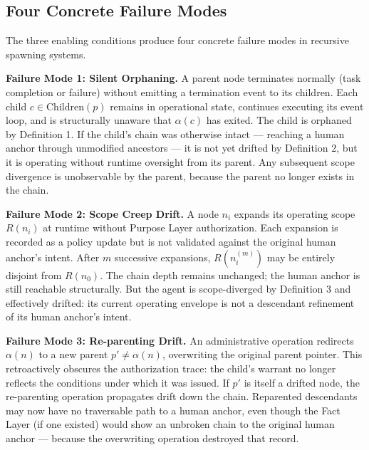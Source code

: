 \subsection{Four Concrete Failure Modes}

The three enabling conditions produce four concrete failure modes in recursive spawning systems.

\medskip
\noindent\textbf{Failure Mode 1: Silent Orphaning.}  A parent node terminates normally (task completion or failure) without emitting a termination event to its children.  Each child $c \in \text{Children}(p)$ remains in operational state, continues executing its event loop, and is structurally unaware that $\alpha(c)$ has exited.  The child is orphaned by Definition 1.  If the child's chain was otherwise intact — reaching a human anchor through unmodified ancestors — it is not yet drifted by Definition 2, but it is operating without runtime oversight from its parent.  Any subsequent scope divergence is unobservable by the parent, because the parent no longer exists in the chain.

\medskip
\noindent\textbf{Failure Mode 2: Scope Creep Drift.}  A node $n_i$ expands its operating scope $R(n_i)$ at runtime without Purpose Layer authorization.  Each expansion is recorded as a policy update but is not validated against the original human anchor's intent.  After $m$ successive expansions, $R(n_i^{(m)})$ may be entirely disjoint from $R(n_0)$.  The chain depth remains unchanged; the human anchor is still reachable structurally.  But the agent is scope-diverged by Definition 3 and effectively drifted: its current operating envelope is not a descendant refinement of its human anchor's intent.

\medskip
\noindent\textbf{Failure Mode 3: Re-parenting Drift.}  An administrative operation redirects $\alpha(n)$ to a new parent $p' \neq \alpha(n)$, overwriting the original parent pointer.  This retroactively obscures the authorization trace: the child's warrant no longer reflects the conditions under which it was issued.  If $p'$ is itself a drifted node, the re-parenting operation propagates drift down the chain.  Reparented descendants may now have no traversable path to a human anchor, even though the Fact Layer (if one existed) would show an unbroken chain to the original human anchor — because the overwriting operation destroyed that record.

